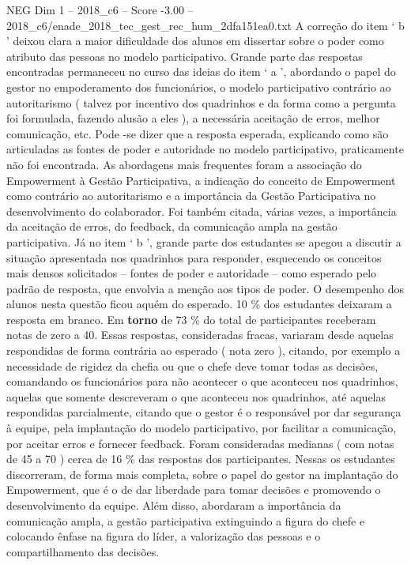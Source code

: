 \begin{textsample}{NEG Dim 1 – 2018\_c6 – Score -3.00 – 2018\_c6/enade\_2018\_tec\_gest\_rec\_hum\_2dfa151ea0.txt}
A correção do item ‘ b ’ deixou clara a maior dificuldade dos alunos em dissertar sobre o poder como atributo das pessoas no modelo participativo.
Grande parte das respostas encontradas permaneceu no curso das ideias do item ‘ a ’, abordando o papel do gestor no empoderamento dos funcionários, o modelo participativo contrário ao autoritarismo ( talvez por incentivo dos quadrinhos e da forma como a pergunta foi formulada, fazendo alusão a eles ), a necessária aceitação de erros, melhor comunicação, etc.
Pode -se dizer que a resposta esperada, explicando como são articuladas as fontes de poder e autoridade no modelo participativo, praticamente não foi encontrada.
As abordagens mais frequentes foram a associação do Empowerment à Gestão Participativa, a indicação do conceito de Empowerment como contrário ao autoritarismo e a importância da Gestão Participativa no desenvolvimento do colaborador.
Foi também citada, várias vezes, a importância da aceitação de erros, do feedback, da comunicação ampla na gestão participativa.
Já no item ‘ b ’, grande parte dos estudantes se apegou a discutir a situação apresentada nos quadrinhos para responder, esquecendo os conceitos mais densos solicitados – fontes de poder e autoridade – como esperado pelo padrão de resposta, que envolvia a menção aos tipos de poder.
O desempenho dos alunos nesta questão ficou aquém do esperado. 10 \% dos estudantes deixaram a resposta em branco.
Em \textbf{torno} de 73 \% do total de participantes receberam notas de zero a 40.
Essas respostas, consideradas fracas, variaram desde aquelas respondidas de forma contrária ao esperado ( nota zero ), citando, por exemplo a necessidade de rigidez da chefia ou que o chefe deve tomar todas as decisões, comandando os funcionários para não acontecer o que aconteceu nos quadrinhos, aquelas que somente descreveram o que aconteceu nos quadrinhos, até aquelas respondidas parcialmente, citando que o gestor é o responsável por dar segurança à equipe, pela implantação do modelo participativo, por facilitar a comunicação, por aceitar erros e fornecer feedback.
Foram consideradas medianas ( com notas de 45 a 70 ) cerca de 16 \% das respostas dos participantes.
Nessas os estudantes discorreram, de forma mais completa, sobre o papel do gestor na implantação do Empowerment, que é o de dar liberdade para tomar decisões e promovendo o desenvolvimento da equipe.
Além disso, abordaram a importância da comunicação ampla, a gestão participativa extinguindo a figura do chefe e colocando ênfase na figura do líder, a valorização das pessoas e o compartilhamento das decisões.

\end{textsample}
